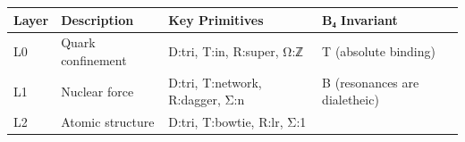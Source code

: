 \documentclass[12pt,a4paper]{article}
\begin{document}
\begin{longtable}[]{@{}llll@{}}
\toprule
\begin{minipage}[b]{0.13\columnwidth}\raggedright
Layer\strut
\end{minipage} & \begin{minipage}[b]{0.23\columnwidth}\raggedright
Description\strut
\end{minipage} & \begin{minipage}[b]{0.27\columnwidth}\raggedright
Key Primitives\strut
\end{minipage} & \begin{minipage}[b]{0.25\columnwidth}\raggedright
B₄ Invariant\strut
\end{minipage}\tabularnewline
\midrule
\endhead
\begin{minipage}[t]{0.13\columnwidth}\raggedright
L0\strut
\end{minipage} & \begin{minipage}[t]{0.23\columnwidth}\raggedright
Quark confinement\strut
\end{minipage} & \begin{minipage}[t]{0.27\columnwidth}\raggedright
D:tri, T:in, R:super, Ω:ℤ\strut
\end{minipage} & \begin{minipage}[t]{0.25\columnwidth}\raggedright
T (absolute binding)\strut
\end{minipage}\tabularnewline
\begin{minipage}[t]{0.13\columnwidth}\raggedright
L1\strut
\end{minipage} & \begin{minipage}[t]{0.23\columnwidth}\raggedright
Nuclear force\strut
\end{minipage} & \begin{minipage}[t]{0.27\columnwidth}\raggedright
D:tri, T:network, R:dagger, Σ:n\strut
\end{minipage} & \begin{minipage}[t]{0.25\columnwidth}\raggedright
B (resonances are dialetheic)\strut
\end{minipage}\tabularnewline
\begin{minipage}[t]{0.13\columnwidth}\raggedright
L2\strut
\end{minipage} & \begin{minipage}[t]{0.23\columnwidth}\raggedright
Atomic structure\strut
\end{minipage} & \begin{minipage}[t]{0.27\columnwidth}\raggedright
D:tri, T:bowtie, R:lr, Σ:1\strut

\end{minipage}
\end{longtable}
\end{document}
